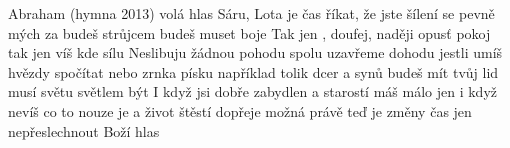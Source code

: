\begin{TEXT}{Abraham (hymna 2013)}
\SLOKA {} volá  hlas\NL
{} Sáru, Lota  je čas\NL
{} říkat, že jste šílení\NL
{} se pevně mých za\NL
{} budeš strůjcem \NL
{} budeš muset  boje
\REFREN  Tak jen , doufej, naději \NL
{} opus\v{t} pokoj \NL
tak jen  víš kde sílu 
\SLOKA Neslibuju žádnou pohodu\NL
spolu uzavřeme dohodu\NL
jestli umíš hvězdy spočítat\NL
nebo zrnka písku například\NL
tolik dcer a synů budeš mít\NL
tvůj lid musí světu světlem být
\SLOKA I když jsi dobře zabydlen\NL
a starostí máš málo jen\NL
i když nevíš co to nouze je\NL
a život štěstí dopřeje\NL
možná právě te\v{d} je změny čas\NL
jen nepřeslechnout Boží hlas
\end{TEXT}
